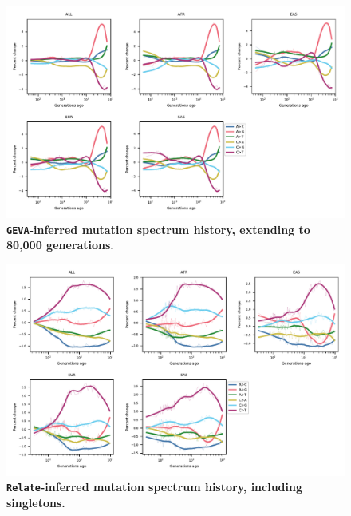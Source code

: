 \documentclass[]{article}
\newcommand{\GEVA}{\texttt{GEVA}\xspace}
\newcommand{\relate}{\texttt{Relate}\xspace}
\begin{document}
\begin{figure}[ht!]
    \centering
    \includegraphics[width=\textwidth]{../plots/spectrum_history.geva.max_age.80000.pdf}
    \caption{
        \textbf{\GEVA-inferred mutation spectrum history, extending to 80,000 generations.}
    }
    \label{fig:geva-spectra-80k}
\end{figure}

\begin{figure}[ht!]
    \centering
    \includegraphics[width=\textwidth]{../plots/spectrum_history.relate.max_age.10000.singletons.pdf}
    \caption{
        \textbf{\relate-inferred mutation spectrum history, including singletons.}
    }
    \label{fig:relate-spectra-singletons}
\end{figure}
\end{document}
